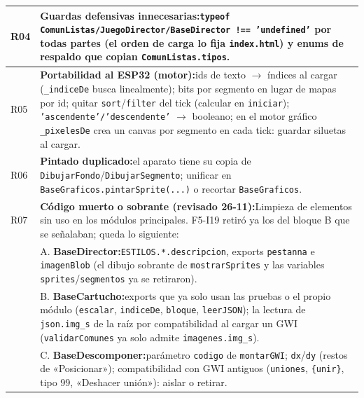 \begin{xltabular}{\textwidth}{l >{\RaggedRight\arraybackslash}X}
	R04 & \textbf{Guardas defensivas innecesarias:}\newline \texttt{typeof ComunListas/JuegoDirector/BaseDirector !== 'undefined'} por todas partes (el orden de carga lo fija \texttt{index.html}) y enums de respaldo que copian \texttt{ComunListas.tipos}. \\
	\midrule
	
	R05 & \textbf{Portabilidad al ESP32 (motor):}\newline ids de texto $\to$ índices al cargar (\texttt{\_indiceDe} busca linealmente); bits por segmento en lugar de mapas por id; quitar \texttt{sort}/\texttt{filter} del tick (calcular en \texttt{iniciar}); \texttt{'ascendente'/'descendente'} $\to$ booleano; en el motor gráfico \texttt{\_pixelesDe} crea un canvas por segmento en cada tick: guardar siluetas al cargar. \\
	\midrule
	
	R06 & \textbf{Pintado duplicado:}\newline el aparato tiene su copia de \texttt{DibujarFondo}/\texttt{DibujarSegmento}; unificar en \texttt{BaseGraficos.pintarSprite(...)} o recortar \texttt{BaseGraficos}. \\
	\midrule
	
	R07 & \textbf{Código muerto o sobrante (revisado 26-11):}\newline Limpieza de elementos sin uso en los módulos principales. F5-I19 retiró ya los del bloque B que se señalaban; queda lo siguiente: \\

		& A. \textbf{BaseDirector:}\newline \texttt{ESTILOS.*.descripcion}, exports \texttt{pestanna} e \texttt{imagenBlob} (el dibujo sobrante de \texttt{mostrarSprites} y las variables \texttt{sprites}/\texttt{segmentos} ya se retiraron). \\
	
		& B. \textbf{BaseCartucho:}\newline exports que ya solo usan las pruebas o el propio módulo (\texttt{escalar}, \texttt{indiceDe}, \texttt{bloque}, \texttt{leerJSON}); la lectura de \texttt{json.img\_s} de la raíz por compatibilidad al cargar un GWI (\texttt{validarComunes} ya solo admite \texttt{imagenes.img\_s}). \\
	
		& C. \textbf{BaseDescomponer:}\newline parámetro \texttt{codigo} de \texttt{montarGWI}; \texttt{dx}/\texttt{dy} (restos de «Posicionar»); compatibilidad con GWI antiguos (\texttt{uniones}, \texttt{\{unir\}}, tipo 99, «Deshacer unión»): aislar o retirar. \\
		

\end{xltabular}
